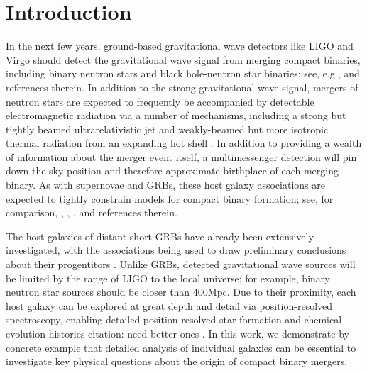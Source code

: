 \documentclass[nofootinbib,twocolumn,prd]{emulateapj}
\newcommand\editremark[1]{{\color{red}#1}}
\newcommand\unit[1]{\text{#1}}
\begin{document}
\section{Introduction}
In the next few years, ground-based gravitational wave detectors like LIGO 
and Virgo  should detect the gravitational
wave signal from merging compact binaries, including  binary  neutron stars and black hole-neutron star binaries; see,
e.g., \cite{LIGO-Inspiral-Rates} and references therein.
In addition to the strong gravitational wave signal, mergers of neutron stars are expected to  frequently be accompanied by detectable
electromagnetic radiation  via a number of  mechanisms, including a strong but tightly beamed
ultrarelativistic jet and weakly-beamed but more isotropic thermal radiation from an expanding hot shell
\citep[see,e.g.,][and references therein]{2013PhRvL.111r1101C,short-grb-GWCoincidenceEM-MetzgerBerger2011}.  
In addition to providing a wealth of information about the merger event itself, a multimessenger detection will pin down
the sky position and therefore approximate birthplace of each merging binary.    
As with supernovae and  GRBs, these host galaxy associations   are expected to tightly constrain models for compact binary
formation; see, for comparison,  \citet{2011MNRAS.412.1508M}, \citet{long-grb-GuettaPiran2007},
\citet{2014ARAA..52...43B}, and references therein. %
%

The host galaxies of distant short GRBs have already been extensively investigated, with the associations being used to
draw preliminary conclusions about their progentitors  \cite{2014ARAA..52...43B}.   
Unlike GRBs, detected gravitational wave sources will be limited by the range of LIGO to the local universe; for
example,  binary neutron star sources should be closer than $400\unit{Mpc}$.  Due to their proximity, each host galaxy
can be explored at great depth and detail via  position-resolved spectroscopy, enabling detailed position-resolved star-formation
and chemical evolution histories \editremark{citation: need better ones} \citep[see,e.g.][]{2009MNRAS.396..462K,2014MNRAS.444..336C}.
In this work, we demonstrate by concrete example that detailed analysis of individual galaxies can be essential to
investigate key physical questions about the origin of compact binary mergers. 
\end{document}
